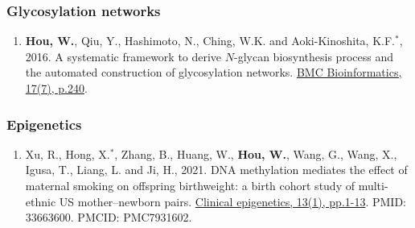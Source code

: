 \documentclass[10pt,letterpaper]{article}
\begin{document}
\subsubsection*{Glycosylation networks}
\begin{enumerate}
\item {\bf Hou, W.}, Qiu, Y., Hashimoto, N., Ching, W.K. and Aoki-Kinoshita, K.F.$^{\ast}$, 2016. A systematic framework to derive $N$-glycan biosynthesis process and the automated construction of glycosylation networks. \href{https://bmcbioinformatics.biomedcentral.com/articles/10.1186/s12859-016-1094-6}{BMC Bioinformatics, 17(7), p.240}.
\end{enumerate}


\subsubsection*{Epigenetics}
\begin{enumerate}
\item Xu, R., Hong, X.$^{\ast}$, Zhang, B., Huang, W., {\bf Hou, W.}, Wang, G., Wang, X., Igusa, T., Liang, L. and Ji, H., 2021. DNA methylation mediates the effect of maternal smoking on offspring birthweight: a birth cohort study of multi-ethnic US mother–newborn pairs. \href{https://clinicalepigeneticsjournal.biomedcentral.com/articles/10.1186/s13148-021-01032-6}{Clinical epigenetics, 13(1), pp.1-13}. PMID: 33663600. PMCID: PMC7931602.
\end{enumerate}
\end{document}
